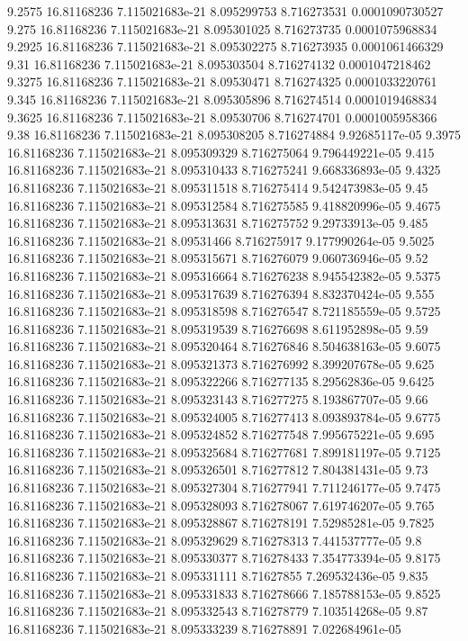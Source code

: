 {9.2575 16.81168236 7.115021683e-21 8.095299753 8.716273531 0.0001090730527
9.275 16.81168236 7.115021683e-21 8.095301025 8.716273735 0.0001075968834
9.2925 16.81168236 7.115021683e-21 8.095302275 8.716273935 0.0001061466329
9.31 16.81168236 7.115021683e-21 8.095303504 8.716274132 0.0001047218462
9.3275 16.81168236 7.115021683e-21 8.09530471 8.716274325 0.0001033220761
9.345 16.81168236 7.115021683e-21 8.095305896 8.716274514 0.0001019468834
9.3625 16.81168236 7.115021683e-21 8.09530706 8.716274701 0.0001005958366
9.38 16.81168236 7.115021683e-21 8.095308205 8.716274884 9.92685117e-05
9.3975 16.81168236 7.115021683e-21 8.095309329 8.716275064 9.796449221e-05
9.415 16.81168236 7.115021683e-21 8.095310433 8.716275241 9.668336893e-05
9.4325 16.81168236 7.115021683e-21 8.095311518 8.716275414 9.542473983e-05
9.45 16.81168236 7.115021683e-21 8.095312584 8.716275585 9.418820996e-05
9.4675 16.81168236 7.115021683e-21 8.095313631 8.716275752 9.29733913e-05
9.485 16.81168236 7.115021683e-21 8.09531466 8.716275917 9.177990264e-05
9.5025 16.81168236 7.115021683e-21 8.095315671 8.716276079 9.060736946e-05
9.52 16.81168236 7.115021683e-21 8.095316664 8.716276238 8.945542382e-05
9.5375 16.81168236 7.115021683e-21 8.095317639 8.716276394 8.832370424e-05
9.555 16.81168236 7.115021683e-21 8.095318598 8.716276547 8.721185559e-05
9.5725 16.81168236 7.115021683e-21 8.095319539 8.716276698 8.611952898e-05
9.59 16.81168236 7.115021683e-21 8.095320464 8.716276846 8.504638163e-05
9.6075 16.81168236 7.115021683e-21 8.095321373 8.716276992 8.399207678e-05
9.625 16.81168236 7.115021683e-21 8.095322266 8.716277135 8.29562836e-05
9.6425 16.81168236 7.115021683e-21 8.095323143 8.716277275 8.193867707e-05
9.66 16.81168236 7.115021683e-21 8.095324005 8.716277413 8.093893784e-05
9.6775 16.81168236 7.115021683e-21 8.095324852 8.716277548 7.995675221e-05
9.695 16.81168236 7.115021683e-21 8.095325684 8.716277681 7.899181197e-05
9.7125 16.81168236 7.115021683e-21 8.095326501 8.716277812 7.804381431e-05
9.73 16.81168236 7.115021683e-21 8.095327304 8.716277941 7.711246177e-05
9.7475 16.81168236 7.115021683e-21 8.095328093 8.716278067 7.619746207e-05
9.765 16.81168236 7.115021683e-21 8.095328867 8.716278191 7.52985281e-05
9.7825 16.81168236 7.115021683e-21 8.095329629 8.716278313 7.441537777e-05
9.8 16.81168236 7.115021683e-21 8.095330377 8.716278433 7.354773394e-05
9.8175 16.81168236 7.115021683e-21 8.095331111 8.71627855 7.269532436e-05
9.835 16.81168236 7.115021683e-21 8.095331833 8.716278666 7.185788153e-05
9.8525 16.81168236 7.115021683e-21 8.095332543 8.716278779 7.103514268e-05
9.87 16.81168236 7.115021683e-21 8.095333239 8.716278891 7.022684961e-05
}
